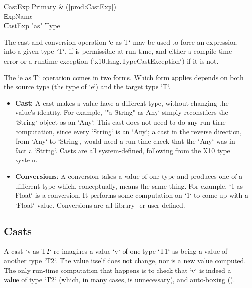 \begin{bbgrammar}
             CastExp \: Primary & (\ref{prod:CastExp}) \\
                     \| ExpName \\
                     \| CastExp \xcd"as" Type \\
\end{bbgrammar}


The cast and conversion  operation \xcd`e as T` may be used to force an
expression into a given type \xcd`T`, 
if is permissible at run time, and either a compile-time error or a runtime
exception 
(\xcd`x10.lang.TypeCastException`) if it is not.  


The \xcd`e as T` operation comes in two forms.  Which form applies depends on
both the source type (the type of \xcd`e`) and the target type \xcd`T`.
\begin{itemize}
\item {\bf Cast:} A cast makes a value have a different type, without changing
      the value's identity.  For example, \xcd`"a String" as Any` simply
      reconsiders the \xcd`String` object as an \xcd`Any`.  
      This cast does not need to do any 
      run-time computation, since every \xcd`String` is an \xcd`Any`; a
      cast in the reverse direction, from \xcd`Any` to \xcd`String`, would
      need a run-time check that the \xcd`Any`
      was in fact a \xcd`String`.
      Casts are all system-defined, following from the
      X10 type system.
\item {\bf Conversions:} A conversion takes a value of one type and produces
      one of a different type which, conceptually, means the same thing.  
      For example, \xcd`1 as Float` is a conversion.  It performs some
      computation on \xcd`1`  to come up with a \xcd`Float` value.
      Conversions are all library- or user-defined.  
\end{itemize}

\subsection{Casts}

A cast \xcd`v as T2` re-imagines a value \xcd`v` of one type \xcd`T1` as being
a value of another 
type \xcd`T2`.  The
value itself does not change, nor is a new value computed.  The only
run-time computation that happens is to check that \xcd`v` is indeed a value
of type \xcd`T2` (which, in many cases, is unnecessary), and auto-boxing
().


